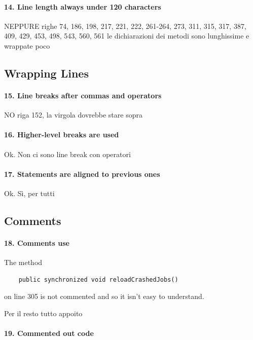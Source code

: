 \documentclass[english]{article}
\begin{document}
\paragraph{14. Line length always under 120 characters}
NEPPURE
righe 74, 186, 198, 217, 221, 222, 261-264, 273, 311, 315, 317, 387, 409, 429, 453, 498, 543, 560, 561
le dichiarazioni dei metodi sono lunghissime e wrappate poco

\subsection{Wrapping Lines}
\paragraph{15. Line breaks after commas and operators}
NO
riga 152, la virgola dovrebbe stare sopra %

\paragraph{16. Higher-level breaks are used}
Ok.
Non ci sono line break con operatori

\paragraph{17. Statements are aligned to previous ones}
Ok.
Sì, per tutti

\subsection{Comments}

\paragraph{18. Comments use}

The method 

\begin{lstlisting} 
	public synchronized void reloadCrashedJobs() 
\end{lstlisting}
 
 on line 305 is not commented and so it isn't easy to understand.

Per il resto tutto appoito

\paragraph{19. Commented out code}
\end{document}
